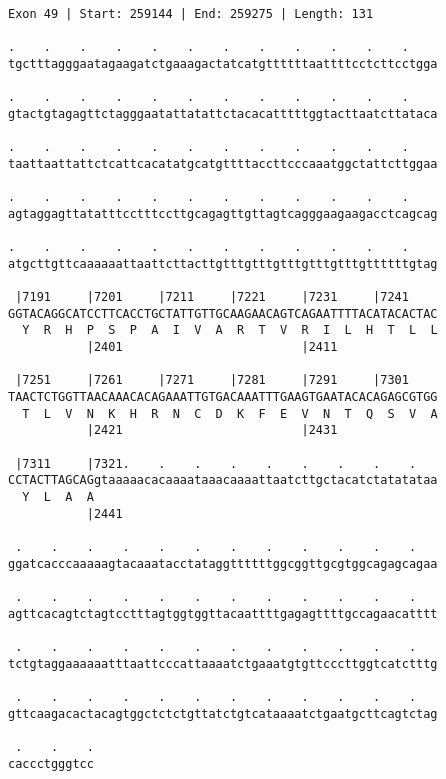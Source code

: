 \documentclass{article}
\begin{document}
\begin{Verbatim}[fontfamily=courier]
Exon 49 | Start: 259144 | End: 259275 | Length: 131

.    .    .    .    .    .    .    .    .    .    .    .    
tgctttagggaatagaagatctgaaagactatcatgttttttaattttcctcttcctgga

.    .    .    .    .    .    .    .    .    .    .    .    
gtactgtagagttctagggaatattatattctacacatttttggtacttaatcttataca

.    .    .    .    .    .    .    .    .    .    .    .    
taattaattattctcattcacatatgcatgttttaccttcccaaatggctattcttggaa

.    .    .    .    .    .    .    .    .    .    .    .    
agtaggagttatatttcctttccttgcagagttgttagtcagggaagaagacctcagcag

.    .    .    .    .    .    .    .    .    .    .    .    
atgcttgttcaaaaaattaattcttacttgtttgtttgtttgtttgtttgttttttgtag

 |7191     |7201     |7211     |7221     |7231     |7241    
GGTACAGGCATCCTTCACCTGCTATTGTTGCAAGAACAGTCAGAATTTTACATACACTAC
  Y  R  H  P  S  P  A  I  V  A  R  T  V  R  I  L  H  T  L  L
           |2401                         |2411              

 |7251     |7261     |7271     |7281     |7291     |7301    
TAACTCTGGTTAACAAACACAGAAATTGTGACAAATTTGAAGTGAATACACAGAGCGTGG
  T  L  V  N  K  H  R  N  C  D  K  F  E  V  N  T  Q  S  V  A
           |2421                         |2431              

 |7311     |7321.    .    .    .    .    .    .    .    .   
CCTACTTAGCAGgtaaaaacacaaaataaacaaaattaatcttgctacatctatatataa
  Y  L  A  A                                                
           |2441                                            

 .    .    .    .    .    .    .    .    .    .    .    .   
ggatcacccaaaaagtacaaatacctataggttttttggcggttgcgtggcagagcagaa

 .    .    .    .    .    .    .    .    .    .    .    .   
agttcacagtctagtcctttagtggtggttacaattttgagagttttgccagaacatttt

 .    .    .    .    .    .    .    .    .    .    .    .   
tctgtaggaaaaaatttaattcccattaaaatctgaaatgtgttcccttggtcatctttg

 .    .    .    .    .    .    .    .    .    .    .    .   
gttcaagacactacagtggctctctgttatctgtcataaaatctgaatgcttcagtctag

 .    .    .
caccctgggtcc
\end{Verbatim}
\newpage
\end{document}

